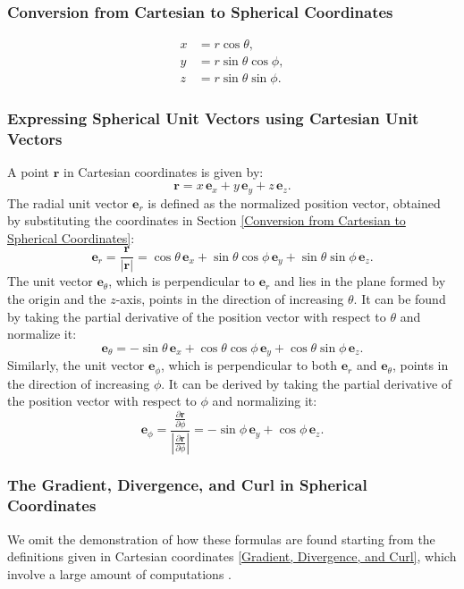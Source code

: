 \documentclass[main]{subfiles}
\begin{document}
\subsubsection{Conversion from Cartesian to Spherical Coordinates} 
\label{Conversion from Spherical to Cartesian Coordinates}
\begin{align}
 x &= r \cos \theta, \\
 y &= r \sin \theta \cos \phi, \\
 z &= r \sin \theta \sin \phi.   
\end{align}

\subsubsection{Expressing Spherical Unit Vectors using Cartesian Unit Vectors}
A point $\mathbf{r}$ in Cartesian coordinates is given by:
\[
\mathbf{r} = x \, \mathbf{e}_x + y \, \mathbf{e}_y + z \, \mathbf{e}_z.
\]
The radial unit vector \( \mathbf{e}_r \) is defined as the normalized position 
vector, obtained by substituting the coordinates in Section
\ref{Conversion from Cartesian to Spherical Coordinates}:
\begin{equation}
\mathbf{e}_r = \frac{\mathbf{r}}{|\mathbf{r}|} = \cos\theta \, \mathbf{e}_x + 
\sin\theta \cos\phi \, \mathbf{e}_y + \sin\theta \sin\phi  \, \mathbf{e}_z.
\label{e_r}
\end{equation}
The unit vector \( \mathbf{e}_\theta \), which is perpendicular to \( 
\mathbf{e}_r \) and lies in the plane formed by the origin and the \( z \)-axis, 
points in the direction of increasing \( \theta \). It can be found by taking the 
partial derivative of the position vector with respect to \( \theta \) and 
normalize it:
\begin{equation}
\mathbf{e}_\theta = -\sin\theta \, \mathbf{e}_x + \cos\theta \cos\phi \, 
\mathbf{e}_y + \cos\theta \sin\phi \, \mathbf{e}_z.
\label{e_theta}
\end{equation}
Similarly, the unit vector \( \mathbf{e}_\phi \), which is perpendicular to both 
\( \mathbf{e}_r \) and \( \mathbf{e}_\theta \), points in the direction of 
increasing \( \phi \). It can be derived by taking the partial derivative of the 
position vector with respect to \( \phi \) and normalizing it:
\[
\mathbf{e}_\phi = \frac{\frac{\partial \mathbf{r}}{\partial 
\phi}}{|\frac{\partial \mathbf{r}}{\partial \phi}|} = - \sin\phi  \, \mathbf{e}_y 
+ \cos\phi \, \mathbf{e}_z.
\]

\subsubsection{The Gradient, Divergence, and Curl in Spherical Coordinates}
We omit the demonstration of how these formulas are found starting from the 
definitions given in Cartesian coordinates \ref{Gradient, Divergence, and Curl}, 
which involve a large amount of computations \cite{book-magnetism}.
\end{document}
